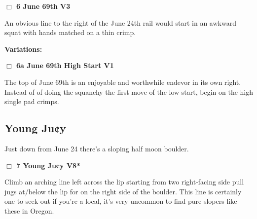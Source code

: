 \begin{multicols}{2}
\needspace{2em}
\label{rt:June 69th}
\colorbox{green!20}{
\parbox{0.95\linewidth}{
\hspace{-1ex}\textbf{$\Box$
6 June 69th V3  
}}}
\begin{adjustwidth}{1.3em}{}			

An obvious line to the right of the June 24th rail would start in an awkward squat with hands matched on a thin crimp.
\end{adjustwidth}


\begin{adjustwidth}{0.5cm}{}				
\needspace{4em}
\textbf{Variations:} \newline

\needspace{2em}
\label{vr:June 69th High Start}
\colorbox{green!20}{
\parbox{0.95\linewidth}{
\hspace{-1ex}\textbf{$\Box$
6a June 69th High Start V1  
}}}
\begin{adjustwidth}{1.3em}{}			

The top of June 69th is an enjoyable and worthwhile endevor in its own right. Instead of of doing the squanchy the first move of the low start, begin on the high single pad crimps.
\end{adjustwidth}



\end{adjustwidth}



\needspace{10em}
\subsection*{Young Ju¢y}\label{bf:Young Ju¢y}

Just down from June 24 there's a sloping half moon boulder.\\



\needspace{2em}
\label{rt:Young Ju¢y}
\colorbox{Goldenrod!20}{
\parbox{0.95\linewidth}{
\hspace{-1ex}\textbf{$\Box$
7 Young Ju¢y V8*  
}}}
\begin{adjustwidth}{1.3em}{}			

Climb an arching line left across the lip starting from two right-facing side pull jugs at/below the lip for on the right side of the boulder. This line is certainly one to seek out if you're a local, it's very uncommon to find pure slopers like these in Oregon.
\end{adjustwidth}



\end{multicols}
